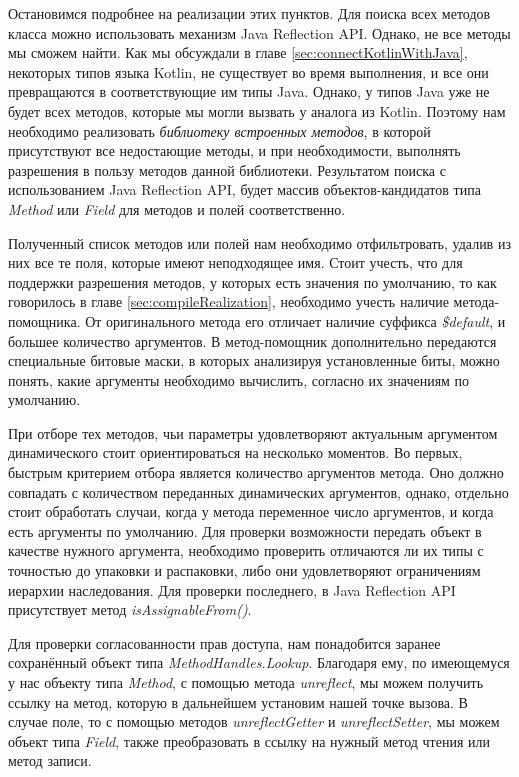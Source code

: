 Остановимся подробнее на реализации этих пунктов. Для поиска всех методов класса можно использовать механизм Java Reflection API. Однако, не все методы мы сможем найти. Как мы обсуждали в главе \ref{sec:connectKotlinWithJava}, некоторых типов языка Kotlin, не существует во время выполнения, и все они превращаются в соответствующие им типы Java. Однако, у типов Java уже не будет всех методов, которые мы могли вызвать у аналога из Kotlin. Поэтому нам необходимо реализовать \textit{библиотеку встроенных методов}, в которой присутствуют все недостающие методы, и при необходимости, выполнять разрешения в пользу методов данной библиотеки. Результатом поиска с использованием Java Reflection API, будет массив объектов-кандидатов типа \textit{Method} или 
\textit{Field} для методов и полей соответственно.

Полученный список методов или полей нам необходимо отфильтровать, удалив из них все те поля, которые имеют неподходящее имя. Стоит учесть, что для поддержки разрешения методов, у которых есть значения по умолчанию, то как говорилось в главе \ref{sec:compileRealization}, необходимо учесть наличие метода-помощника. От оригинального метода его отличает наличие суффикса \textit{\$default}, и большее количество аргументов. В метод-помощник дополнительно передаются специальные битовые маски, в которых анализируя установленные биты, можно понять, какие аргументы необходимо вычислить, согласно их значениям по умолчанию.

При отборе тех методов, чьи параметры удовлетворяют актуальным аргументом динамического стоит ориентироваться на несколько моментов. Во первых, быстрым критерием отбора является количество аргументов метода. Оно должно совпадать с количеством переданных динамических аргументов, однако, отдельно стоит обработать случаи, когда у метода переменное число аргументов, и когда есть аргументы по умолчанию. Для проверки возможности передать объект в качестве нужного аргумента, необходимо проверить отличаются ли их типы с точностью до упаковки и распаковки, либо они удовлетворяют ограничениям иерархии наследования. Для проверки последнего, в Java Reflection API присутствует метод \textit{isAssignableFrom()}.

Для проверки согласованности прав доступа, нам понадобится заранее сохранённый объект типа \textit{MethodHandles.Lookup}. Благодаря ему, по имеющемуся у нас объекту типа \textit{Method}, с помощью метода \textit{unreflect}, мы можем получить ссылку на метод, которую в дальнейшем установим нашей точке вызова. В случае поле, то с помощью методов \textit{unreflectGetter} и 
\textit{unreflectSetter}, мы можем объект типа \textit{Field}, также преобразовать в ссылку на нужный метод чтения или метод записи.

